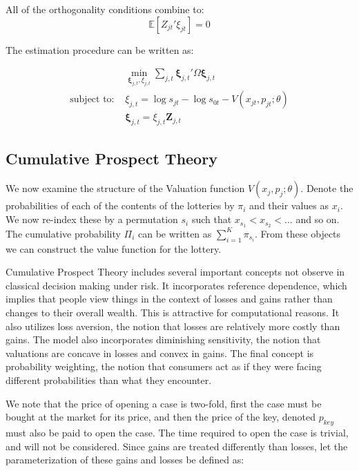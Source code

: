 \documentclass[12pt]{paper}
\newcommand{\exV}[1]{\mathbb{E} \left [ #1 \right ]}
\begin{document}
All of the orthogonality conditions combine to:
\begin{equation*}
  \exV{Z_{jt}'\xi_{jt}} = 0
\end{equation*}

The estimation procedure can be written as:

\begin{align}
  &\min_{\bm{\xi}_{j,t}, \xi_{j,t}} \sum_{j,t}\bm{\xi}_{j,t}' \Omega \bm{\xi}_{j,t}\\
  \text{subject to: } &\xi_{j,t} = \log s_{jt} - \log s_{0t} - V( x_{jt}, p_{jt}; \theta)\\
  &\bm{\xi}_{j,t} = \xi_{j,t} \bm{Z}_{j,t}  
\end{align}



\subsection{Cumulative Prospect Theory}


We now examine the structure of the Valuation function $V( x_j,
p_j; \theta)$. Denote the probabilities of each of the contents of the
lotteries by $\pi_i$ and their values as $x_i$. We now re-index these by
a permutation $s_i$ such that $x_{s_1} < x_{s_2} < ...$ and so on. The
cumulative probability $\Pi_i$ can be written as $\sum_{i=1}^K
\pi_{s_i}$. From these objects we can construct the value function for
the lottery.

Cumulative Prospect Theory includes several important concepts not
observe in classical decision making under risk. It incorporates
reference dependence, which implies that people view things in the
context of losses and gains rather than changes to their overall
wealth. This is attractive for computational reasons. It also utilizes
loss aversion, the notion that losses are relatively more costly than
gains. The model also incorporates diminishing sensitivity, the notion
that valuations are concave in losses and convex in gains. The final
concept is probability weighting, the notion that consumers act as if
they were facing different probabilities than what they encounter.

We note that the price of opening a case is two-fold, first the case
must be bought at the market for its price, and then the price of the
key, denoted $p_{key}$ must also be paid to open the case. The time
required to open the case is trivial, and will not be
considered. Since gains are treated differently than losses, let the
parameterization of these gains and losses be defined as:
\end{document}
